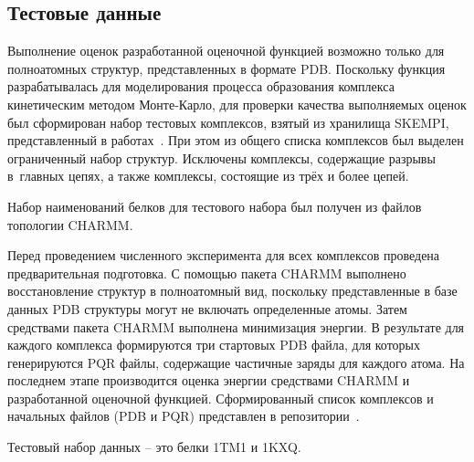 \subsection{Тестовые данные}


Выполнение оценок разработанной оценочной функцией возможно только для полноатомных структур, представленных в формате PDB. Поскольку функция разрабатывалась для моделирования процесса образования комплекса кинетическим методом Монте-Карло, для проверки качества выполняемых оценок был сформирован набор тестовых комплексов, взятый из хранилища SKEMPI\cite{skempi}, представленный в работах~\cite{biom10071056, rate}. При этом из общего списка комплексов был выделен ограниченный набор структур. Исключены комплексы, содержащие разрывы в~главных цепях, а также комплексы, состоящие из трёх и более цепей. 

Набор наименований белков для тестового набора был получен из файлов топологии CHARMM.

Перед проведением численного эксперимента для всех комплексов проведена предварительная подготовка. С помощью пакета CHARMM выполнено восстановление структур в полноатомный вид, поскольку представленные в базе данных PDB структуры могут не включать определенные атомы. Затем средствами пакета CHARMM выполнена минимизация энергии. В результате для каждого комплекса формируются три стартовых PDB файла, для которых генерируются PQR файлы, содержащие частичные заряды для каждого атома. На последнем этапе производится оценка энергии средствами CHARMM и разработанной оценочной функцией. Сформированный список комплексов и начальных файлов (PDB и PQR) представлен в репозитории~\cite{vcs}.

Тестовый набор данных -- это белки 1TM1 и 1KXQ.